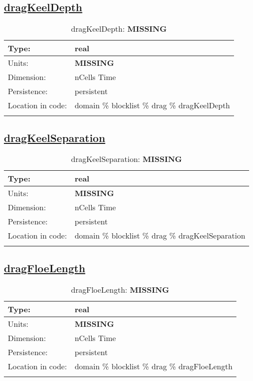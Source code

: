 \subsection[dragKeelDepth]{\hyperref[sec:var_tab_drag]{dragKeelDepth}}
\label{subsec:var_sec_drag_dragKeelDepth}
\begin{center}
\begin{longtable}{| p{2.0in} | p{4.0in} |}
        \hline 
        Type: & real \\
        \hline 
        Units: & {\bf \color{red} MISSING} \\
        \hline 
        Dimension: & nCells Time \\
        \hline 
        Persistence: & persistent \\
        \hline 
         Location in code: & domain \% blocklist \% drag \% dragKeelDepth \\
         \hline 
    \caption{dragKeelDepth: {\bf \color{red} MISSING}}
\end{longtable}
\end{center}
\subsection[dragKeelSeparation]{\hyperref[sec:var_tab_drag]{dragKeelSeparation}}
\label{subsec:var_sec_drag_dragKeelSeparation}
\begin{center}
\begin{longtable}{| p{2.0in} | p{4.0in} |}
        \hline 
        Type: & real \\
        \hline 
        Units: & {\bf \color{red} MISSING} \\
        \hline 
        Dimension: & nCells Time \\
        \hline 
        Persistence: & persistent \\
        \hline 
         Location in code: & domain \% blocklist \% drag \% dragKeelSeparation \\
         \hline 
    \caption{dragKeelSeparation: {\bf \color{red} MISSING}}
\end{longtable}
\end{center}
\subsection[dragFloeLength]{\hyperref[sec:var_tab_drag]{dragFloeLength}}
\label{subsec:var_sec_drag_dragFloeLength}
\begin{center}
\begin{longtable}{| p{2.0in} | p{4.0in} |}
        \hline 
        Type: & real \\
        \hline 
        Units: & {\bf \color{red} MISSING} \\
        \hline 
        Dimension: & nCells Time \\
        \hline 
        Persistence: & persistent \\
        \hline 
         Location in code: & domain \% blocklist \% drag \% dragFloeLength \\
         \hline 
    \caption{dragFloeLength: {\bf \color{red} MISSING}}
\end{longtable}
\end{center}
